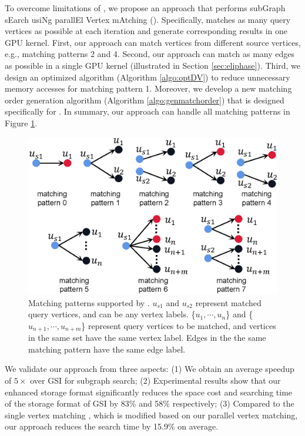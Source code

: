 To overcome limitations of \cite{lai2015scalable}, we propose an approach that performs subGraph sEarch usiNg parallEl Vertex mAtching (\SystemName).  Specifically, \SystemName matches as many query vertices as possible at each iteration and generate corresponding results in one GPU kernel. First, our approach can match vertices from different source vertices, e.g., matching patterns 2 and 4. Second, our approach can match as many edges as possible in a single GPU kernel (illustrated in Section \ref{sec:eliphase}). Third, we design an optimized algorithm (Algorithm \ref{algo:optDV}) to reduce unnecessary memory accesses for matching pattern 1. Moreover, we develop a new matching order generation algorithm (Algorithm \ref{algo:genmatchorder}) that is designed specifically for \SystemName. In summary, our approach can handle all matching patterns in Figure \ref{fig:matchpattern}.

\begin{figure}
\centering
\includegraphics[width=0.9\columnwidth]{./figure/extpattern.eps}
\caption{Matching patterns supported by \SystemName. $u_{s1}$ and $u_{s2}$ represent matched query vertices, and can be any vertex labels. \{$u_1, \cdots, u_{n}$\} and
\{$u_{n+1}, \cdots, u_{n+m}$\} represent query vertices to be matched, and vertices in the same set have the same vertex label. Edges in the the same matching pattern have the same edge label.}
\label{fig:matchpattern}
\end{figure}

 We validate our approach from three aspects: (1) We obtain an average speedup of $5\times$ over GSI for subgraph search; (2) Experimental results show that our enhanced storage format significantly reduces the space cost and searching time of the storage format of GSI by 83\% and 58\% respectively; (3) Compared to the single vertex matching , which is modified based on our parallel vertex matching, our approach reduces the search time by 15.9\% on average.

